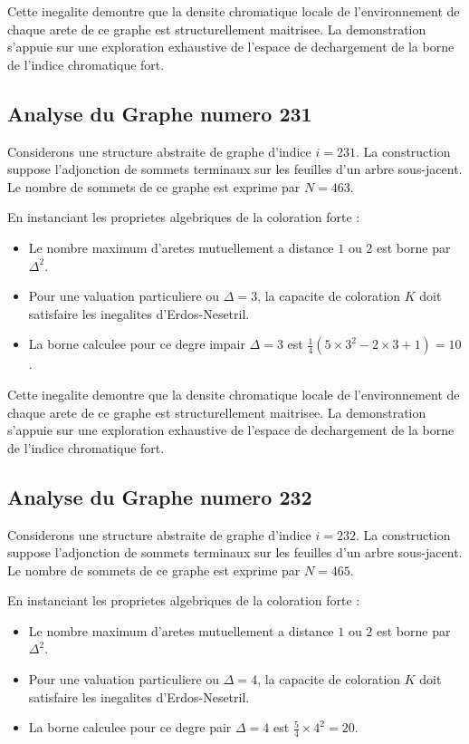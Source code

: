 \documentclass[11pt,a4paper]{article}
\begin{document}
Cette inegalite demontre que la densite chromatique locale de l'environnement de chaque arete de ce graphe est structurellement maitrisee. La demonstration s'appuie sur une exploration exhaustive de l'espace de dechargement de la borne de l'indice chromatique fort.

\subsection{Analyse du Graphe numero 231}
Considerons une structure abstraite de graphe d'indice $i = 231$. La construction suppose l'adjonction de sommets terminaux sur les feuilles d'un arbre sous-jacent. Le nombre de sommets de ce graphe est exprime par $N = 463$.

En instanciant les proprietes algebriques de la coloration forte :
\begin{itemize}
\item Le nombre maximum d'aretes mutuellement a distance $1$ ou $2$ est borne par $\Delta^2$.
\item Pour une valuation particuliere ou $\Delta = 3$, la capacite de coloration $K$ doit satisfaire les inegalites d'Erdos-Nesetril.
\item La borne calculee pour ce degre impair $\Delta = 3$ est $\frac{1}{4}(5 \times 3^2 - 2 \times 3 + 1) = 10$.
\end{itemize}

Cette inegalite demontre que la densite chromatique locale de l'environnement de chaque arete de ce graphe est structurellement maitrisee. La demonstration s'appuie sur une exploration exhaustive de l'espace de dechargement de la borne de l'indice chromatique fort.

\subsection{Analyse du Graphe numero 232}
Considerons une structure abstraite de graphe d'indice $i = 232$. La construction suppose l'adjonction de sommets terminaux sur les feuilles d'un arbre sous-jacent. Le nombre de sommets de ce graphe est exprime par $N = 465$.

En instanciant les proprietes algebriques de la coloration forte :
\begin{itemize}
\item Le nombre maximum d'aretes mutuellement a distance $1$ ou $2$ est borne par $\Delta^2$.
\item Pour une valuation particuliere ou $\Delta = 4$, la capacite de coloration $K$ doit satisfaire les inegalites d'Erdos-Nesetril.
\item La borne calculee pour ce degre pair $\Delta = 4$ est $\frac{5}{4} \times 4^2 = 20$.
\end{itemize}
\end{document}
